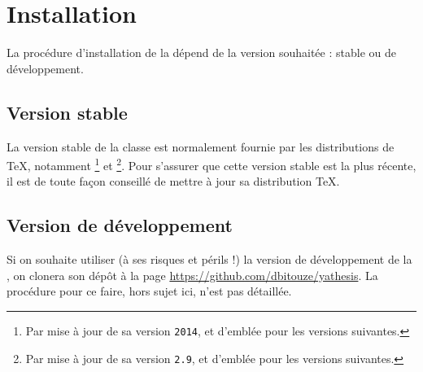 \chapter{Installation}\label{cha-installation}
%

%
La procédure d'installation de la \yatCl{} dépend de la version souhaitée :
stable ou de développement.

\section{Version stable}
\label{sec-version-stable}
%
%
%

La version stable de la classe est normalement fournie par les distributions de
\TeX{}, notamment \texlive\footnote{Par mise à jour de sa version \texttt{2014},
  et d'emblée pour les versions suivantes.} et \miktex\footnote{Par mise à jour
  de sa version \texttt{2.9}, et d'emblée pour les versions suivantes.}. Pour
s'assurer que cette version stable est la plus récente, il est de toute façon
conseillé de mettre à jour sa distribution \TeX{}.

\section{Version de développement}
\label{sec-vers-de-devel}

Si on souhaite utiliser (à ses risques et périls !) la version de développement
de la \yatCl{}, on clonera son dépôt  à la page
\url{https://github.com/dbitouze/yathesis}. La procédure pour ce faire, hors
sujet ici, n'est pas détaillée.

